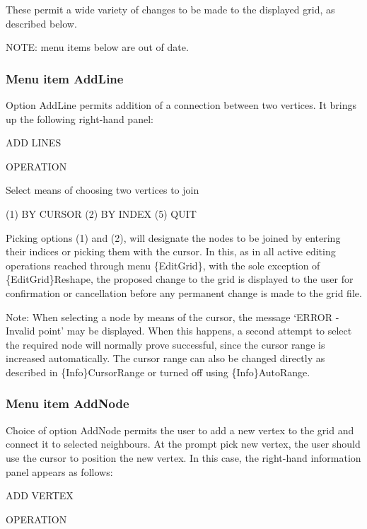 \documentclass{article}
\begin{document}
These permit a wide variety of changes to be made to the displayed grid, as described below.

NOTE: menu items below are out of date.

\subsubsection[Menu item AddLine]{Menu item AddLine}
Option AddLine permits addition of a connection between two vertices. It brings up the following right-hand panel:

ADD LINES

OPERATION

Select means of choosing\newline
two vertices to join

(1) BY CURSOR\newline
(2) BY INDEX\newline
 \newline
(5) QUIT

Picking options (1) and (2), will designate the nodes to be joined by entering their indices or picking them with the cursor. In this, as in all active editing operations reached through menu \{EditGrid\}, with the sole exception of \{EditGrid\}Reshape, the proposed change to the grid is displayed to the user for confirmation or cancellation before any permanent change is made to the grid file.

Note: When selecting a node by means of the cursor, the message `ERROR - Invalid point' may be displayed. When this happens, a second attempt to select the required node will normally prove successful, since the cursor range is increased automatically. The cursor range can also be changed directly as described in \{Info\}CursorRange or turned off using \{Info\}AutoRange.

\subsubsection[Menu item AddNode]{Menu item AddNode}
Choice of option AddNode permits the user to add a new vertex to the grid and connect it to selected neighbours. At the prompt {\textquotedbl}pick new vertex{\textquotedbl}, the user should use the cursor to position the new vertex. In this case, the right-hand information panel appears as follows:

ADD VERTEX

OPERATION


\bigskip
\end{document}
